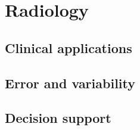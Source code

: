 \chapter{Radiology}



\clearpage
\section{Clinical applications}


\clearpage
\section{Error and variability}



\clearpage
\section{Decision support}
